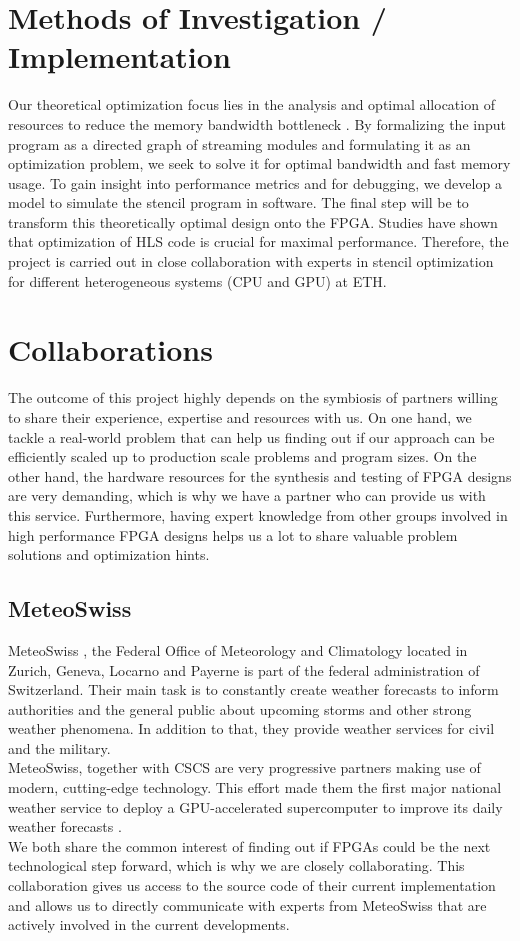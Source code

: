 \section{Methods of Investigation / Implementation}
Our theoretical optimization focus lies in the analysis and optimal allocation of resources to reduce the memory bandwidth bottleneck \cite{label2,label3,label28}. By formalizing the input program as a directed graph of streaming modules and formulating it as an optimization problem, we seek to solve it for optimal bandwidth and fast memory usage. To gain insight into performance metrics and for debugging, we develop a model to simulate the stencil program in software. The final step will be to transform this theoretically optimal design onto the FPGA. Studies \cite{label4,label5,label18,label33,label30} have shown that optimization of HLS code is crucial for maximal performance. Therefore, the project is carried out in close collaboration with experts in stencil optimization for different heterogeneous systems (CPU and GPU) \cite{label2,label3,label29, label12,label11,label10,label9} at ETH.


\section{Collaborations}
The outcome of this project highly depends on the symbiosis of partners willing to share their experience, expertise and resources with us. On one hand, we tackle a real-world problem that can help us finding out if our approach can be efficiently scaled up to production scale problems and program sizes. On the other hand, the hardware resources for the synthesis and testing of FPGA designs are very demanding, which is why we have a partner who can provide us with this service. Furthermore, having expert knowledge from other groups involved in high performance FPGA designs helps us a lot to share valuable problem solutions and optimization hints.


\subsection{MeteoSwiss}
MeteoSwiss \cite{label43}, the Federal Office of Meteorology and Climatology located in Zurich, Geneva, Locarno and Payerne is part of the federal administration of Switzerland. Their main task is to constantly create weather forecasts to inform authorities and the general public about upcoming storms and other strong weather phenomena. In addition to that, they provide weather services for civil and the military. \\
MeteoSwiss, together with CSCS are very progressive partners making use of modern, cutting-edge technology. This effort made them the first major national weather service to deploy a GPU-accelerated supercomputer to improve its daily weather forecasts \cite{label44}. \\
We both share the common interest of finding out if FPGAs could be the next technological step forward, which is why we are closely collaborating. This collaboration gives us access to the source code of their current implementation and allows us to directly communicate with experts from MeteoSwiss that are actively involved in the current developments.


